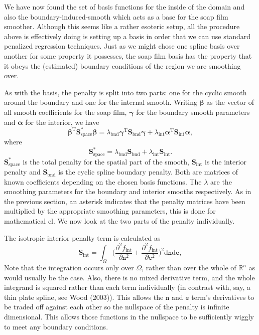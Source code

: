 \documentclass[10pt] {article}
\theoremstyle{definition}
\theoremstyle{plain}
\begin{document}
We have now found the set of basis functions for the inside of the domain and also the boundary-induced-smooth which acts as a base for the soap film smoother. Although this seems like a rather esoteric setup, all the procedure above is effectively doing is setting up a basis in order that we can use standard penalized regression techniques. Just as we might chose one spline basis over another for some property it possesses,  the soap film basis has the property that it obeys the (estimated) boundary conditions of the region we are smoothing over.

As with the basis, the penalty is split into two parts: one for the cyclic smooth around the boundary and one for the internal smooth. Writing $\bm\beta$ as the vector of all smooth coefficients for the soap film, $\bm\gamma$ for the boundary smooth parameters and $\bm\alpha$ for the interior, we have
$$
\bm\beta^\text{T}\textbf{S}^*_\text{space}\bm{\beta} = \lambda_\text{bnd} \bm\gamma^\text{T}\textbf{S}_\text{bnd}\bm{\gamma} + \lambda_\text{int} \bm{\alpha}^\text{T}\textbf{S}_\text{int}\bm{\alpha},
$$
where 
$$
\textbf{S}^*_\text{space} = \lambda_\text{bnd} \textbf{S}_\text{bnd} + \lambda_\text{int} \textbf{S}_\text{int}.
$$
$\textbf{S}^*_\text{space}$ is the total penalty for the spatial part of the smooth, $\textbf{S}_\text{int}$ is the interior penalty and $\textbf{S}_\text{bnd}$ is the cyclic spline boundary penalty. Both are matrices of known coefficients depending on the chosen basis functions. The $\lambda$ are the smoothing parameters for the boundary and interior smooths respectively. As in the previous section, an asterisk indicates that the penalty matrices have been multiplied by the appropriate smoothing parameters, this is done for mathematical el. We now look at the two parts of the penalty individually. 

The isotropic interior penalty term is calculated as
$$
\textbf{S}_\text{int} = \int_\Omega \Big(\frac{\partial^2 f_\text{int}}{\partial \texttt{n}^2}+\frac{\partial^2 f_\text{int}}{\partial \texttt{e}^2} 
\Big)^2\text{d}\texttt{n}\text{d}\texttt{e},
$$
Note that the integration occurs only over $\Omega$, rather than over the whole of $\mathbb{R}^n$ as would usually be the case. Also, there is no mixed derivative term, and the whole integrand is squared rather than each term individually (in contrast with, say, a thin plate spline, see Wood (2003)). This allows the $\texttt{n}$ and $\texttt{e}$ term's derivatives to be traded off against each other so the nullspace of the penalty is infinite dimensional. This allows those functions in the nullspace to be sufficiently wiggly to meet any boundary conditions. 
\end{document}
